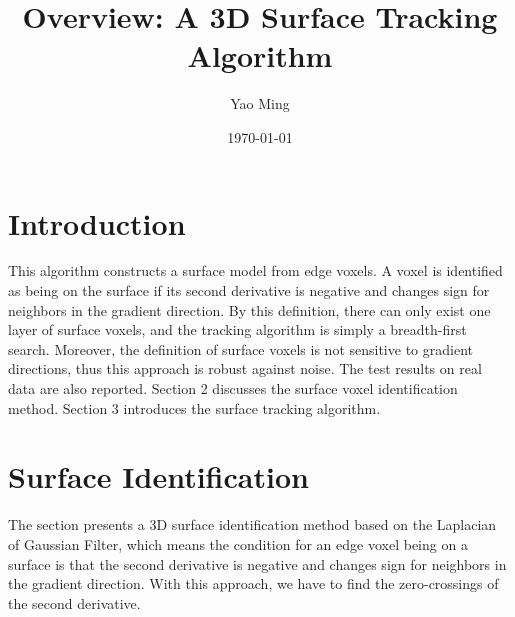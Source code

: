 \documentclass{article}
\begin{document}
\title{Overview: A 3D Surface Tracking Algorithm}
\author{Yao Ming}
\date{\today}
\maketitle
\newpage


\section{Introduction}

This algorithm constructs a surface model from edge voxels. A voxel is
identified as being on the surface if its second derivative is negative and
changes sign for neighbors in the gradient direction. By this definition, there
can only exist one layer of surface voxels, and the tracking algorithm is simply
a breadth-first search. Moreover, the definition of surface voxels is not
sensitive to gradient directions, thus this approach is robust against
noise. The test results on real data are also reported.
Section 2 discusses the surface voxel identification method. Section 3
introduces the surface tracking algorithm.

\section{Surface Identification}
The section presents a 3D surface identification method based on the Laplacian
of Gaussian Filter, which means the condition for an edge voxel being on a
surface is that the second derivative is negative and changes sign for neighbors
in the gradient direction. With this approach, we have to find the
zero-crossings of the second derivative.
\end{document}
